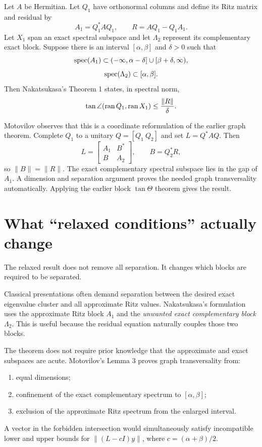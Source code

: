 Let $A$ be Hermitian. Let $Q_1$ have orthonormal columns and define its Ritz matrix and residual by
\[
  A_1=Q_1^*AQ_1,
  \qquad
  R=AQ_1-Q_1A_1.
\]
Let $X_1$ span an exact spectral subspace and let $\Lambda_2$ represent its complementary exact block. Suppose there is an interval $[\alpha,\beta]$ and $\delta>0$ such that
\[
  \operatorname{spec}(A_1)\subset(-\infty,\alpha-\delta]\cup[\beta+\delta,\infty),
\]
\[
  \operatorname{spec}(\Lambda_2)\subset[\alpha,\beta].
\]
Then Nakatsukasa's Theorem 1 states, in spectral norm,
\[
  \tan\angle(\operatorname{ran} Q_1,\operatorname{ran} X_1)
  \le\frac{\|R\|}{\delta}.
\]

Motovilov observes that this is a coordinate reformulation of the earlier graph theorem. Complete $Q_1$ to a unitary $Q=[Q_1\ Q_2]$ and set $L=Q^*AQ$. Then
\[
  L=\begin{bmatrix}A_1&B^*\\B&A_2\end{bmatrix},
  \qquad B=Q_2^*R,
\]
so $\|B\|=\|R\|$. The exact complementary spectral subspace lies in the gap of $A_1$. A dimension and separation argument proves the needed graph transversality automatically. Applying the earlier block $\tan\Theta$ theorem gives the result.

\section{What ``relaxed conditions'' actually change}

The relaxed result does not remove all separation. It changes which blocks are required to be separated.

Classical presentations often demand separation between the desired exact eigenvalue cluster and all approximate Ritz values. Nakatsukasa's formulation uses the approximate Ritz block $A_1$ and the \emph{unwanted exact complementary block} $\Lambda_2$. This is useful because the residual equation naturally couples those two blocks.

The theorem does not require prior knowledge that the approximate and exact subspaces are acute. Motovilov's Lemma 3 proves graph transversality from:
\begin{enumerate}
\item equal dimensions;
\item confinement of the exact complementary spectrum to $[\alpha,\beta]$;
\item exclusion of the approximate Ritz spectrum from the enlarged interval.
\end{enumerate}
A vector in the forbidden intersection would simultaneously satisfy incompatible lower and upper bounds for $\|(L-cI)y\|$, where $c=(\alpha+\beta)/2$.

